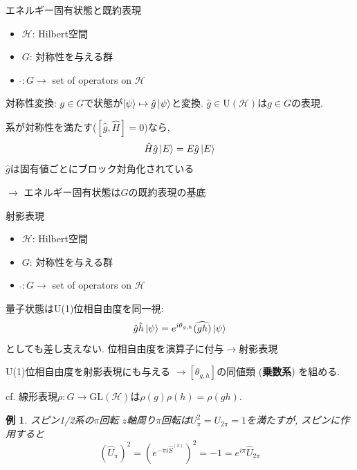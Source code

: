 \documentclass[dvipdfm]{beamer}
\newtheorem*{exmpl}{例}
\begin{document}


\begin{frame}{エネルギー固有状態と既約表現}
    \begin{itemize}
        \item $\mathcal{H}$: Hilbert空間
        \item $G$: 対称性を与える群
        \item $\widehat{}: G\to$ set of operators on $\mathcal{H}$
    \end{itemize}
    対称性変換: $g\in G$で状態が$\ket{\psi}\mapsto\hat{g}\ket{\psi}$と変換.
    $\hat{g}\in\mathrm{U}(\mathcal{H})$は$g\in G$の表現.

    系が対称性を満たす($[\hat{g},\hat{H}]=0$)なら,
    \begin{equation*}
        \hat{H}\hat{g}\ket{E}
        =
        E\hat{g}\ket{E}
    \end{equation*}
    $\hat{g}$は固有値ごとにブロック対角化されている

    $\longrightarrow$
    \alert{エネルギー固有状態は$G$の既約表現の基底}
\end{frame}

\begin{frame}{射影表現}
    \begin{itemize}
        \item $\mathcal{H}$: Hilbert空間
        \item $G$: 対称性を与える群
        \item $\widehat{}: G\to$ set of operators on $\mathcal{H}$
    \end{itemize}
    量子状態はU(1)位相自由度を同一視:
    \begin{equation*}
        \hat{g}\hat{h}\ket{\psi}
        =
        e^{i\theta_{g,h}}\widehat{(gh)}\ket{\psi}
    \end{equation*}
    としても差し支えない.
    位相自由度を演算子に付与$\rightarrow$\alert{射影表現}

    U(1)位相自由度を射影表現にも与える
    $\longrightarrow[\theta_{g,h}]$の同値類 (\textbf{乗数系}) を組める.

    cf. 線形表現$\rho: G\to\mathrm{GL}(\mathcal{H})$は$\rho(g)\rho(h)=\rho(gh)$.

    \begin{exmpl}{スピン1/2系の$\pi$回転}{}
        $z$軸周り$\pi$回転は$U_\pi^2=U_{2\pi}=1$を満たすが, スピンに作用すると
        \begin{equation*}
            (\hat{U}_\pi)^2
            =
            (e^{-\pi i\hat{S}^{(3)}})^2
            =
            -1
            =
            e^{i\pi}\hat{U}_{2\pi}
        \end{equation*}
    \end{exmpl}
\end{frame}
\end{document}
